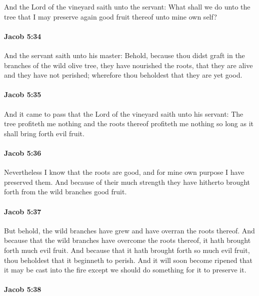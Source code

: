 			And the Lord of the vineyard saith unto the servant:
			What shall we do unto the tree
			that I may preserve again good fruit thereof unto mine own self?

		\paragraph{Jacob 5:34} %
			\label{JACOB-5-34}

			And the servant saith unto his master:
			Behold, because thou didst graft in the branches of the wild olive tree,
			they have nourished the roots,
			that they are alive and they have not perished;
			wherefore thou beholdest that they are yet good.

		\paragraph{Jacob 5:35} %
			\label{JACOB-5-35}

			And it came to pass that the Lord of the vineyard saith unto his servant:
			The tree profiteth me nothing
			and the roots thereof profiteth me nothing
			so long as it shall bring forth evil fruit.

		\paragraph{Jacob 5:36} %
			\label{JACOB-5-36}

			Nevertheless I know that the roots are good,
			and for mine own purpose I have preserved them.
			And because of their much strength
			they have hitherto brought forth from the wild branches good fruit.

		\paragraph{Jacob 5:37} %
			\label{JACOB-5-37}

			But behold, the wild branches have grew and have overran the roots thereof.
			And because that the wild branches have overcome the roots thereof,
			it hath brought forth much evil fruit.
			And because that it hath brought forth so much evil fruit,
			thou beholdest that it beginneth to perish.
			And it will soon become ripened that it may be cast into the fire
			except we should do something for it to preserve it.

		\paragraph{Jacob 5:38} %
			\label{JACOB-5-38}

